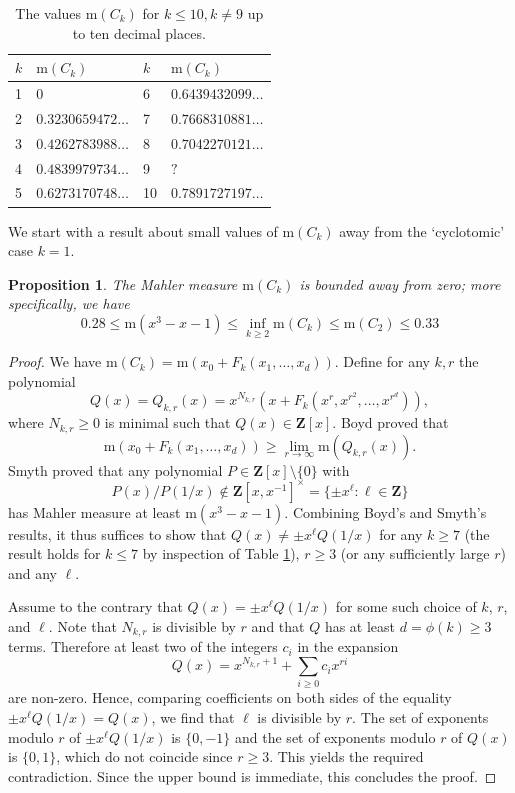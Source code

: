 \documentclass[12pt,reqno]{amsart}
\theoremstyle{definition}
\theoremstyle{plain}
\newtheorem{proposition}[theorem]{Proposition}
\theoremstyle{definition}
\newcommand{\Z}{\mathbf{Z}}
\newcommand\m{\mathrm{m}}
\renewcommand{\geq}{\geqslant}
\renewcommand{\leq}{\leqslant}
\begin{document}
 \begin{table}[ht!]
\centering
\begin{tabular}{ll|ll}
\toprule
$k$ 	& $\m(C_k)$ & $k$ 	& $\m(C_k)$  \\ \midrule
1 		& $0$	   & 6 		& $0.6439432099\dots$ \\ 
2 		& $0.3230659472\dots$   & 7		& $0.7668310881\dots$ \\
3 		& $0.4262783988\dots$	 & 8		& $0.7042270121\dots$ \\
4 		& $0.4839979734\dots$  & 9 		& $?$ \\
5 		& $0.6273170748\dots $ & 10 	& $0.7891727197 \dots$ \\
\bottomrule
\end{tabular}
\caption{The values $\m(C_k)$ for $k \leq 10, k \neq 9$ up to ten decimal places.}\label{tab:mCk}
\end{table}

We start with a result about small values of $\m(C_k)$ away from the `cyclotomic' case $k=1$. 

\begin{proposition} 
\label{infmck} 
The Mahler measure $\m(C_k)$ is bounded away from zero; 
more specifically, we have 
$$ 0.28 \leq \m(x^3-x-1) \leq  \inf_{k \geq 2} \m(C_k) \leq \m(C_2) \leq 0.33 $$
\end{proposition}
\begin{proof}
We have $\m(C_k) = \m(x_0 + F_k(x_1, \ldots, x_d))$. 
Define for any $k, r$ the polynomial $$Q(x) = Q_{k,r}(x) = x^{N_{k,r}}(x + F_k(x^r, x^{r^2}, \ldots, x^{r^d})),$$ where $N_{k,r} \geq 0$ is minimal such that $Q(x) \in \Z[x]$.
Boyd \cite[pp.~118--119]{Boyd} proved that 
\begin{equation*}
\m(x_0 + F_k(x_1, \ldots, x_d)) \geq \lim_{r \to \infty} \m(Q_{k,r}(x)).
\end{equation*}
Smyth \cite{SmythBLMS} proved that any polynomial $P \in \Z[x]\setminus \{0\}$ with 
$$P(x)/P(1/x)  \notin \Z[x,x^{-1}]^\times = \{ \pm x^\ell \colon \ell \in \Z \}$$  has Mahler measure at least $\m(x^3-x-1)$.
Combining Boyd's and Smyth's results, it thus suffices to show that $Q(x) \neq \pm x^{\ell}Q(1/x)$ for any $k \geq 7$ (the result holds for $k \leq 7$ by inspection of Table \ref{tab:mCk}), $r \geq 3$ (or any sufficiently large $r$) and any $\ell$.

Assume to the contrary that $Q(x) = \pm x^{\ell}Q(1/x)$ for some such choice of $k$, $r$, and $\ell$. Note that $N_{k,r}$ is divisible by $r$ and that $Q$ has at least $d = \phi(k) \geq 3$ terms. Therefore at least two of the integers $c_i$ in the expansion
\[
Q(x) = x^{N_{k,r} + 1} + \sum_{i \geq 0} c_i x^{r i}
\]
are non-zero. Hence, comparing coefficients on both sides of the equality $\pm  x^{\ell} Q(1/x) = Q(x)$, we find that $\ell$ is divisible by $r$. The set of exponents modulo $r$ of $\pm x^{\ell} Q(1/x)$  is $\{0,-1\}$ and the set of exponents modulo $r$ of $Q(x)$ is $\{0,1\}$, which do not coincide since $r \geq 3$. This yields the required contradiction. 
Since the upper bound is immediate, this concludes the proof.
\end{proof}
\end{document}
